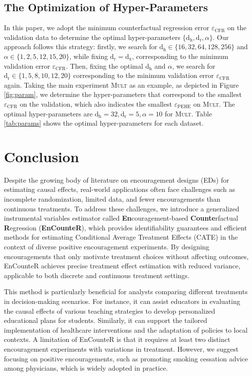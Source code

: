 \documentclass[journal]{IEEEtran}
\begin{document}
\subsection{The Optimization of Hyper-Parameters}
\label{app:parameters}

In this paper, we adopt the minimum counterfactual regression error $\varepsilon_{\text{CFR}}$ on the validation data to determine the optimal hyper-parameters $\{\text{d}_\text{h},\text{d}_\text{r},\alpha\}$. Our approach follows this strategy: firstly, we search for $\text{d}_\text{h} \in \{16,32,64,128,256\}$ and $\alpha \in \{1,2,5,12,15,20\}$, while fixing $\text{d}_\text{r}=\text{d}_\text{x}$, corresponding to the minimum validation error $\varepsilon_{\text{CFR}}$. Then, fixing the optimal $\text{d}_\text{h}$ and $\alpha$, we search for $\text{d}_\text{r} \in \{1,5,8,10,12,20\}$ corresponding to the minimum validation error $\varepsilon_{\text{CFR}}$ again. 
Taking the main experiment \textsc{Mult} as an example, as depicted in Figure \ref{fig:param}, we determine the hyper-parameters that correspond to the smallest $\varepsilon_{\text{CFR}}$ on the validation, which also indicates the smallest $\varepsilon_{\text{PEHE}}$ on \textsc{Mult}. The optimal hyper-parameters are $\text{d}_\text{h}=32, \text{d}_\text{r}=5, \alpha=10$ for \textsc{Mult}. Table \ref{tab:params} shows the optimal hyper-parameters for each dataset.


\section{Conclusion}
Despite the growing body of literature on encouragement designs (EDs) for estimating causal effects, real-world applications often face challenges such as incomplete randomization, limited data, and fewer encouragements than continuous treatments. To address these challenges, we introduce a generalized instrumental variables estimator called \textbf{En}couragement-based \textbf{Counte}rfactual \textbf{R}egression (\textbf{EnCounteR}), which provides identifiability guarantees and efficient methods for estimating Conditional Average Treatment Effects (CATE) in the context of diverse positive encouragement experiments. By designing encouragements that only motivate treatment choices without affecting outcomes, EnCounteR achieves precise treatment effect estimation with reduced variance, applicable to both discrete and continuous treatment settings.


This method is particularly beneficial for analysts comparing different treatments in decision-making scenarios. For instance, it can assist educators in evaluating the causal effects of various teaching strategies to develop personalized educational plans for students. Similarly, it can support the tailored implementation of healthcare interventions and the adaptation of policies to local contexts. A limitation of EnCounteR is that it requires at least two distinct encouragement experiments with variations in treatment. However, we suggest focusing on positive encouragements, such as promoting smoking cessation advice among physicians, which is widely adopted in practice. 
\end{document}
